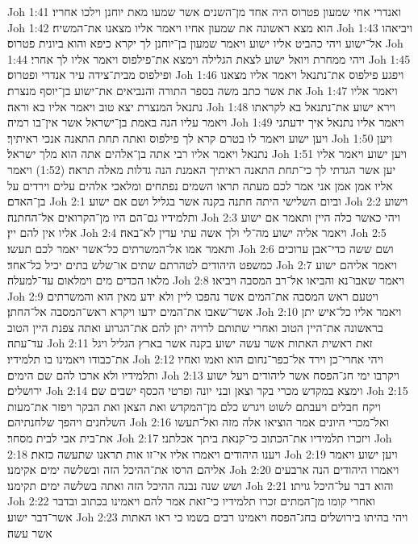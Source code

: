 Joh 1:41  ואנדרי אחי שמעון פטרוס היה אחד מן־השנים אשר שמעו מאת יוחנן וילכו אחריו׃
Joh 1:42  הוא מצא ראשונה את שמעון אחיו ויאמר אליו מצאנו את־המשיח׃
Joh 1:43  ויביאהו אל־ישוע ויהי כהביט אליו ישוע ויאמר שמעון בן־יוחנן לך יקרא כיפא והוא ביונית פטרוס׃
Joh 1:44  ויהי ממחרת ויואל ישוע לצאת הגלילה וימצא את־פילפוס ויאמר אליו לך אחרי׃
Joh 1:45  ופילפוס מבית־צידה עיר אנדרי ופטרוס׃
Joh 1:46  ויפגע פילפוס את־נתנאל ויאמר אליו מצאנו את אשר כתב משה בספר התורה והנביאים את־ישוע בן־יוסף מנצרת׃
Joh 1:47  ויאמר אליו נתנאל המנצרת יצא טוב ויאמר אליו בא וראה׃
Joh 1:48  וירא ישוע את־נתנאל בא לקראתו ויאמר עליו הנה באמת בן־ישראל אשר אין־בו רמיה׃
Joh 1:49  ויאמר אליו נתנאל איך ידעתני ויען ישוע ויאמר לו בטרם קרא לך פילפוס ואתה תחת התאנה אנכי ראיתיך׃
Joh 1:50  ויען נתנאל ויאמר אליו רבי אתה בן־אלהים אתה הוא מלך ישראל׃
Joh 1:51  ויען ישוע ויאמר אליו יען אשר הגדתי לך כי־תחת התאנה ראיתיך האמנת הנה גדלות מאלה תראה׃ (1:52) ויאמר אליו אמן אמן אני אמר לכם מעתה תראו השמים נפתחים ומלאכי אלהים עלים וירדים על בן־האדם׃
Joh 2:1  וביום השלישי היתה חתנה בקנה אשר בגליל ושם אם ישוע׃
Joh 2:2  וישוע ותלמידיו גם־הם היו מן־הקרואים אל־החתנה׃
Joh 2:3  ויהי כאשר כלה היין ותאמר אם ישוע אליו אין להם יין׃
Joh 2:4  ויאמר אליה ישוע מה־לי ולך אשה עתי עדין לא־באה׃
Joh 2:5  ותאמר אמו אל־המשרתים כל־אשר יאמר לכם תעשו׃
Joh 2:6  ושם ששה כדי־אבן ערוכים כמשפט היהודים לטהרתם שתים או־שלש בתים יכיל כל־אחד׃
Joh 2:7  ויאמר אליהם ישוע מלאו הכדים מים וימלאום עד־למעלה׃
Joh 2:8  ויאמר שאבו־נא והביאו אל־רב המסבה ויביאו׃
Joh 2:9  ויטעם ראש המסבה את־המים אשר נהפכו ליין ולא ידע מאין הוא והמשרתים אשר־שאבו את־המים ידעו ויקרא ראש־המסבה אל־החתן׃
Joh 2:10  ויאמר אליו כל־איש יתן בראשונה את־היין הטוב ואחרי שתותם לרויה יתן להם את־הגרוע ואתה צפנת היין הטוב עד־עתה׃
Joh 2:11  זאת ראשית האתות אשר עשה ישוע בקנה אשר בארץ הגליל ויגל את־כבודו ויאמינו בו תלמידיו׃
Joh 2:12  ויהי אחרי־כן וירד אל־כפר־נחום הוא ואמו ואחיו ותלמידיו ולא ארכו להם שם הימים׃
Joh 2:13  ויקרבו ימי חג־הפסח אשר ליהודים ויעל ישוע ירושלים׃
Joh 2:14  וימצא במקדש מכרי בקר וצאן ובני יונה ופרטי הכסף ישבים שם׃
Joh 2:15  ויקח חבלים ויעבתם לשוט ויגרש כלם מן־המקדש ואת הצאן ואת הבקר ויפזר את־מעות השלחנים ויהפך שלחנתיהם׃
Joh 2:16  ואל־מכרי היונים אמר הוציאו אלה מזה ואל־תעשו את־בית אבי לבית מסחר׃
Joh 2:17  ויזכרו תלמידיו את־הכתוב כי־קנאת ביתך אכלתני׃
Joh 2:18  ויענו היהודים ויאמרו אליו אי־זו אות תראנו שתעשה כזאת׃
Joh 2:19  ויען ישוע ויאמר אליהם הרסו את־ההיכל הזה ובשלשה ימים אקימנו׃
Joh 2:20  ויאמרו היהודים הנה ארבעים ושש שנה נבנה ההיכל הזה ואתה בשלשה ימים תקימנו׃
Joh 2:21  והוא דבר על־היכל גויתו׃
Joh 2:22  ואחרי קומו מן־המתים זכרו תלמידיו כי־זאת אמר להם ויאמינו בכתוב ובדבר אשר־דבר ישוע׃
Joh 2:23  ויהי בהיתו בירושלים בחג־הפסח ויאמינו רבים בשמו כי ראו האתות אשר עשה׃
